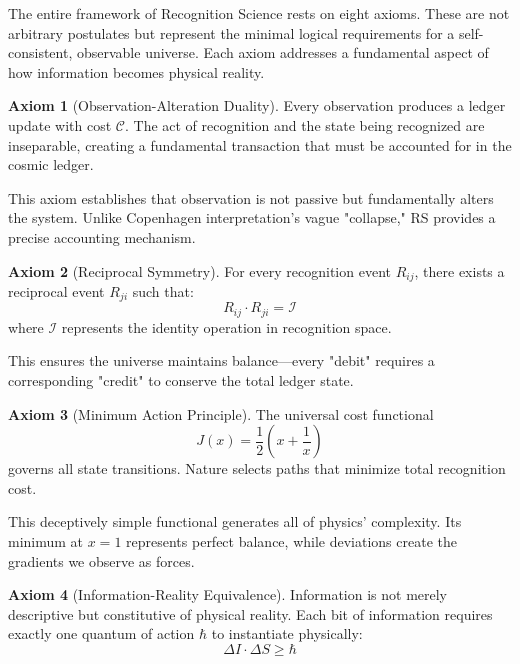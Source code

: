 \documentclass[12pt,a4paper]{article}
\theoremstyle{definition}
\newtheorem{axiom}{Axiom}
\begin{document}
The entire framework of Recognition Science rests on eight axioms. These are not arbitrary postulates but represent the minimal logical requirements for a self-consistent, observable universe. Each axiom addresses a fundamental aspect of how information becomes physical reality.

\begin{axiom}[Observation-Alteration Duality]
Every observation produces a ledger update with cost $\mathcal{C}$. The act of recognition and the state being recognized are inseparable, creating a fundamental transaction that must be accounted for in the cosmic ledger.
\end{axiom}

This axiom establishes that observation is not passive but fundamentally alters the system. Unlike Copenhagen interpretation's vague "collapse," RS provides a precise accounting mechanism.

\begin{axiom}[Reciprocal Symmetry]
For every recognition event $R_{ij}$, there exists a reciprocal event $R_{ji}$ such that:
\begin{equation}
    R_{ij} \cdot R_{ji} = \mathcal{I}
\end{equation}
where $\mathcal{I}$ represents the identity operation in recognition space.
\end{axiom}

This ensures the universe maintains balance—every "debit" requires a corresponding "credit" to conserve the total ledger state.

\begin{axiom}[Minimum Action Principle]
The universal cost functional
\begin{equation}
    J(x) = \frac{1}{2}\left(x + \frac{1}{x}\right)
\end{equation}
governs all state transitions. Nature selects paths that minimize total recognition cost.
\end{axiom}

This deceptively simple functional generates all of physics' complexity. Its minimum at $x = 1$ represents perfect balance, while deviations create the gradients we observe as forces.

\begin{axiom}[Information-Reality Equivalence]
Information is not merely descriptive but constitutive of physical reality. Each bit of information requires exactly one quantum of action $\hbar$ to instantiate physically:
\begin{equation}
    \Delta I \cdot \Delta S \geq \hbar
\end{equation}
\end{axiom}
\end{document}
